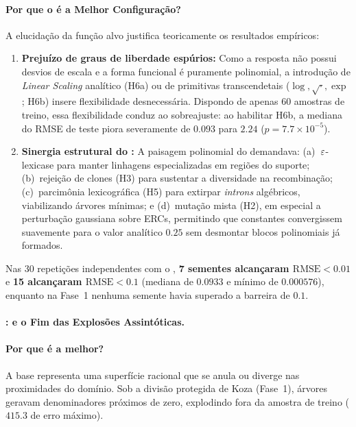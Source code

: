 \paragraph{Por que o  é a Melhor Configuração?}
A elucidação da função alvo justifica teoricamente os resultados empíricos:
\begin{enumerate}
  \item \textbf{Prejuízo de graus de liberdade espúrios:} Como a resposta não
        possui desvios de escala e a forma funcional é puramente polinomial, a
        introdução de \emph{Linear Scaling} analítico (H6a) ou de primitivas
        transcendetais ($\log, \sqrt{\cdot}, \exp$; H6b) insere flexibilidade
        desnecessária. Dispondo de apenas 60 amostras de treino, essa flexibilidade
        conduz ao sobreajuste: ao habilitar H6b, a mediana do RMSE de teste piora
        severamente de $0.093$ para $2.24$ ($p = 7.7 \times 10^{-5}$).
  \item \textbf{Sinergia estrutural do :} A paisagem polinomial do
         demandava: (a)~$\varepsilon$-lexicase para manter linhagens
        especializadas em regiões do suporte; (b)~rejeição de clones (H3) para
        sustentar a diversidade na recombinação; (c)~parcimônia lexicográfica (H5)
        para extirpar \emph{introns} algébricos, viabilizando árvores mínimas; e
        (d)~mutação mista (H2), em especial a perturbação gaussiana sobre ERCs,
        permitindo que constantes convergissem suavemente para o valor analítico
        $0.25$ sem desmontar blocos polinomiais já formados.
\end{enumerate}
Nas 30 repetições independentes com o , \textbf{7 sementes alcançaram $\text{RMSE} < 0.01$}
e \textbf{15 alcançaram $\text{RMSE} < 0.1$} (mediana de $0.0933$ e mínimo de
$0.000576$), enquanto na Fase~1 nenhuma semente havia superado a barreira de $0.1$.

\paragraph{:  e o Fim das Explosões Assintóticas.}
\label{sec:melhor_synth2}

\paragraph{Por que é a melhor?}
A base  representa uma superfície racional que se anula ou
diverge nas proximidades do domínio. Sob a divisão protegida de Koza (Fase~1),
árvores geravam denominadores próximos de zero, explodindo fora da amostra de
treino ($415.3$ de erro máximo).

